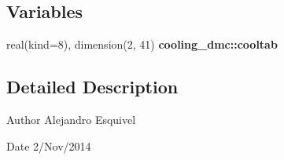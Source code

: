 \subsection*{Variables}
\begin{DoxyCompactItemize}
\item 
\hypertarget{namespacecooling__dmc_aa692bc7125c6e889f3cf993f9f48f9d3}{}real(kind=8), dimension(2, 41) {\bfseries cooling\+\_\+dmc\+::cooltab}\label{namespacecooling__dmc_aa692bc7125c6e889f3cf993f9f48f9d3}

\end{DoxyCompactItemize}


\subsection{Detailed Description}
\begin{DoxyAuthor}{Author}
Alejandro Esquivel 
\end{DoxyAuthor}
\begin{DoxyDate}{Date}
2/\+Nov/2014 
\end{DoxyDate}
